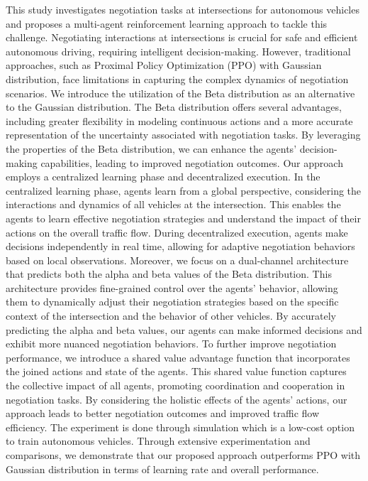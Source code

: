 \begin{e-abstract}
This study investigates negotiation tasks at intersections for autonomous vehicles and proposes a multi-agent reinforcement learning approach to tackle this challenge.
Negotiating interactions at intersections is crucial for safe and efficient autonomous driving, requiring intelligent decision-making.
However, traditional approaches, such as Proximal Policy Optimization (PPO) with Gaussian distribution, face limitations in capturing the complex dynamics of negotiation scenarios.
We introduce the utilization of the Beta distribution as an alternative to the Gaussian distribution.
The Beta distribution offers several advantages, including greater flexibility in modeling continuous actions and a more accurate representation of the uncertainty associated with negotiation tasks.
By leveraging the properties of the Beta distribution, we can enhance the agents' decision-making capabilities, leading to improved negotiation outcomes.
Our approach employs a centralized learning phase and decentralized execution.
In the centralized learning phase, agents learn from a global perspective, considering the interactions and dynamics of all vehicles at the intersection.
This enables the agents to learn effective negotiation strategies and understand the impact of their actions on the overall traffic flow.
During decentralized execution, agents make decisions independently in real time, allowing for adaptive negotiation behaviors based on local observations.
Moreover, we focus on a dual-channel architecture that predicts both the alpha and beta values of the Beta distribution.
This architecture provides fine-grained control over the agents' behavior, allowing them to dynamically adjust their negotiation strategies based on the specific context of the intersection and the behavior of other vehicles.
By accurately predicting the alpha and beta values, our agents can make informed decisions and exhibit more nuanced negotiation behaviors.
To further improve negotiation performance, we introduce a shared value advantage function that incorporates the joined actions and state of the agents.
This shared value function captures the collective impact of all agents, promoting coordination and cooperation in negotiation tasks.
By considering the holistic effects of the agents' actions, our approach leads to better negotiation outcomes and improved traffic flow efficiency.
The experiment is done through simulation which is a low-cost option to train autonomous vehicles.
Through extensive experimentation and comparisons, we demonstrate that our proposed approach outperforms PPO with Gaussian distribution in terms of learning rate and overall performance.

\end{e-abstract}
